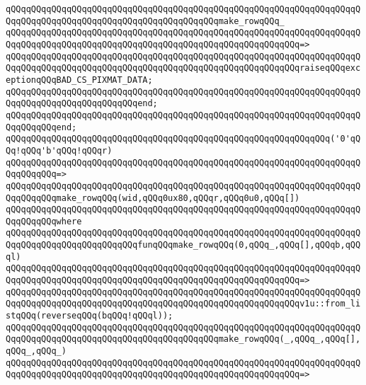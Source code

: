 \newline
\verb|qQQqqQQqqQQqqQQqqQQqqQQqqQQqqQQqqQQqqQQqqQQqqQQqqQQqqQQqqQQqqQQqqQQqqQQqqQQqqQQqqQQqqQQqqQQqqQQqqQQqqQQqqQQqqQQqmake_rowqQQq_|\newline
\verb|qQQqqQQqqQQqqQQqqQQqqQQqqQQqqQQqqQQqqQQqqQQqqQQqqQQqqQQqqQQqqQQqqQQqqQQqqQQqqQQqqQQqqQQqqQQqqQQqqQQqqQQqqQQqqQQqqQQqqQQqqQQqqQQq=>|\newline
\verb|qQQqqQQqqQQqqQQqqQQqqQQqqQQqqQQqqQQqqQQqqQQqqQQqqQQqqQQqqQQqqQQqqQQqqQQqqQQqqQQqqQQqqQQqqQQqqQQqqQQqqQQqqQQqqQQqqQQqqQQqqQQqqQQqraiseqQQqexceptionqQQqBAD_CS_PIXMAT_DATA;|\newline
\verb|qQQqqQQqqQQqqQQqqQQqqQQqqQQqqQQqqQQqqQQqqQQqqQQqqQQqqQQqqQQqqQQqqQQqqQQqqQQqqQQqqQQqqQQqqQQqqQQqend;|\newline
\verb|qQQqqQQqqQQqqQQqqQQqqQQqqQQqqQQqqQQqqQQqqQQqqQQqqQQqqQQqqQQqqQQqqQQqqQQqqQQqqQQqend;|\newline
\newline
\verb|qQQqqQQqqQQqqQQqqQQqqQQqqQQqqQQqqQQqqQQqqQQqqQQqqQQqqQQqqQQqqQQq('0'qQQq!qQQq'b'qQQq!qQQqr)|\newline
\verb|qQQqqQQqqQQqqQQqqQQqqQQqqQQqqQQqqQQqqQQqqQQqqQQqqQQqqQQqqQQqqQQqqQQqqQQqqQQqqQQq=>|\newline
\verb|qQQqqQQqqQQqqQQqqQQqqQQqqQQqqQQqqQQqqQQqqQQqqQQqqQQqqQQqqQQqqQQqqQQqqQQqqQQqqQQqmake_rowqQQq(wid,qQQq0ux80,qQQqr,qQQq0u0,qQQq[])|\newline
\verb|qQQqqQQqqQQqqQQqqQQqqQQqqQQqqQQqqQQqqQQqqQQqqQQqqQQqqQQqqQQqqQQqqQQqqQQqqQQqqQQqwhere|\newline
\verb|qQQqqQQqqQQqqQQqqQQqqQQqqQQqqQQqqQQqqQQqqQQqqQQqqQQqqQQqqQQqqQQqqQQqqQQqqQQqqQQqqQQqqQQqqQQqqQQqfunqQQqmake_rowqQQq(0,qQQq_,qQQq[],qQQqb,qQQql)|\newline
\verb|qQQqqQQqqQQqqQQqqQQqqQQqqQQqqQQqqQQqqQQqqQQqqQQqqQQqqQQqqQQqqQQqqQQqqQQqqQQqqQQqqQQqqQQqqQQqqQQqqQQqqQQqqQQqqQQqqQQqqQQqqQQqqQQq=>|\newline
\verb|qQQqqQQqqQQqqQQqqQQqqQQqqQQqqQQqqQQqqQQqqQQqqQQqqQQqqQQqqQQqqQQqqQQqqQQqqQQqqQQqqQQqqQQqqQQqqQQqqQQqqQQqqQQqqQQqqQQqqQQqqQQqqQQqv1u::from_listqQQq(reverseqQQq(bqQQq!qQQql));|\newline
\newline
\verb|qQQqqQQqqQQqqQQqqQQqqQQqqQQqqQQqqQQqqQQqqQQqqQQqqQQqqQQqqQQqqQQqqQQqqQQqqQQqqQQqqQQqqQQqqQQqqQQqqQQqqQQqqQQqqQQqmake_rowqQQq(_,qQQq_,qQQq[],qQQq_,qQQq_)|\newline
\verb|qQQqqQQqqQQqqQQqqQQqqQQqqQQqqQQqqQQqqQQqqQQqqQQqqQQqqQQqqQQqqQQqqQQqqQQqqQQqqQQqqQQqqQQqqQQqqQQqqQQqqQQqqQQqqQQqqQQqqQQqqQQqqQQq=>|\newline
